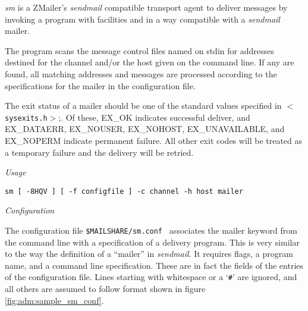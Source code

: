 
{\em sm} is a ZMailer's {\em sendmail} compatible transport agent to
deliver messages by invoking a program with facilities and in a way 
compatible with a {\em sendmail} mailer.


The program scans the message control files named on stdin
for addresses destined for the channel and/or the host
given on the command line. If any are found, all matching
addresses and messages are processed according to the
specifications for the mailer in the configuration file.

The exit status of a mailer should be one of the standard
values specified in {\tt {\(<\)}sysexits.h{\(>\)}};.
Of these, EX\_OK indicates successful deliver, and EX\_DATAERR,
EX\_NOUSER, EX\_NOHOST, EX\_UNAVAILABLE, and EX\_NOPERM indicate
permanent failure.
All other exit codes will be treated as a temporary failure
and the delivery will be retried.

{\em Usage}

{\tt sm [ -8HQV ] [ -f configfile ] -c channel -h host mailer}


{\em Configuration}

The configuration file {\tt \$MAILSHARE/sm.conf } associates
the mailer keyword from the command line with a specification
of a delivery program.
This is very similar to the way the definition of a ``mailer'' in
{\em sendmail}.
It requires flags, a program name, and a command line specification.
These are in fact the fields of the entries of the configuration file.
Lines starting with whitespace or a `{\tt \#}' are ignored, and all
others are assumed to follow format shown in figure
\vref{fig:adm:sample_sm_conf}.


